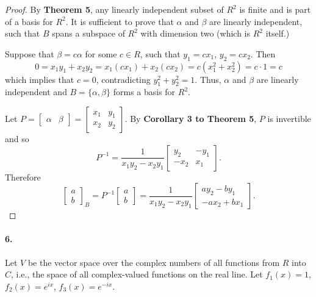 \documentclass{article}
\begin{document}
\begin{proof}
  By \textbf{Theorem 5}, any linearly independent subset of $R^2$ is finite and
  is part of a basis for $R^2$. It is sufficient to prove that $\alpha$ and
  $\beta$ are linearly independent, such that $B$ spans a subspace of $R^2$ with
  dimension two (which is $R^2$ itself.)

  Suppose that $\beta = c\alpha$ for some $c \in R$, such that $y_1 = cx_1$,
  $y_2 = cx_2$. Then \[
    0 = x_1y_1 + x_2y_2 = x_1(cx_1) + x_2(cx_2) = c(x_1^2 + x_2^2) = c \cdot 1 =
    c
  \] which implies that $c = 0$, contradicting $y_1^2 + y_2^2 = 1$. Thus,
  $\alpha$ and $\beta$ are linearly independent and $B = \{\alpha, \beta\}$
  forms a basis for $R^2$.

  Let $P = \begin{bmatrix}
    \alpha & \beta
  \end{bmatrix} = \begin{bmatrix}
    x_1 & y_1 \\
    x_2 & y_2
  \end{bmatrix}$. By \textbf{Corollary 3 to Theorem 5}, $P$ is invertible and so
  \[
    P^{-1} = \frac{1}{x_1y_2 - x_2y_1}\begin{bmatrix}
      y_2 & -y_1 \\
      -x_2 & x_1
    \end{bmatrix}.
  \] Therefore \[
    \begin{bmatrix}
      a \\
      b
    \end{bmatrix}_B = P^{-1}\begin{bmatrix}
      a \\
      b
    \end{bmatrix} = \frac{1}{x_1y_2 - x_2y_1}\begin{bmatrix}
      ay_2 - by_1 \\
      -ax_2 + bx_1
    \end{bmatrix}.
  \]
\end{proof}

\paragraph{6.} Let $V$ be the vector space over the complex numbers of all
functions from $R$ into $C$, i.e., the space of all complex-valued functions on
the real line. Let $f_1(x) = 1$, $f_2(x) = e^{ix}$, $f_3(x) = e^{-ix}$.
\end{document}
